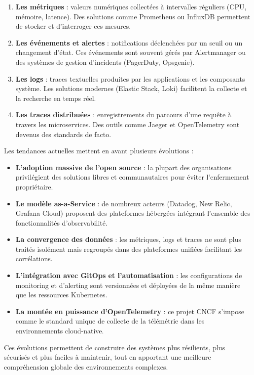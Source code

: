\begin{enumerate}
	\item \textbf{Les métriques} : valeurs numériques collectées à intervalles réguliers (CPU, mémoire, latence). Des solutions comme Prometheus ou InfluxDB permettent de stocker et d’interroger ces mesures.
	\item \textbf{Les événements et alertes} : notifications déclenchées par un seuil ou un changement d’état. Ces événements sont souvent gérés par Alertmanager ou des systèmes de gestion d’incidents (PagerDuty, Opsgenie).
	\item \textbf{Les logs} : traces textuelles produites par les applications et les composants système. Les solutions modernes (Elastic Stack, Loki) facilitent la collecte et la recherche en temps réel.
	\item \textbf{Les traces distribuées} : enregistrements du parcours d’une requête à travers les microservices. Des outils comme Jaeger et OpenTelemetry sont devenus des standards de facto.
\end{enumerate}

Les tendances actuelles mettent en avant plusieurs évolutions :

\begin{itemize}
	\item \textbf{L’adoption massive de l’open source} : la plupart des organisations privilégient des solutions libres et communautaires pour éviter l’enfermement propriétaire.
	\item \textbf{Le modèle as-a-Service} : de nombreux acteurs (Datadog, New Relic, Grafana Cloud) proposent des plateformes hébergées intégrant l’ensemble des fonctionnalités d’observabilité.
	\item \textbf{La convergence des données} : les métriques, logs et traces ne sont plus traités isolément mais regroupés dans des plateformes unifiées facilitant les corrélations.
	\item \textbf{L’intégration avec GitOps et l’automatisation} : les configurations de monitoring et d’alerting sont versionnées et déployées de la même manière que les ressources Kubernetes.
	\item \textbf{La montée en puissance d’OpenTelemetry} : ce projet CNCF s’impose comme le standard unique de collecte de la télémétrie dans les environnements cloud-native.
\end{itemize}

Ces évolutions permettent de construire des systèmes plus résilients, plus sécurisés et plus faciles à maintenir, tout en apportant une meilleure compréhension globale des environnements complexes.

